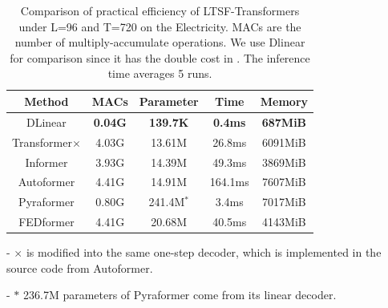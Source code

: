 \begin{table}[h]
\vspace{-0.1cm}
        \centering
        \scalebox{0.9}
        {
        	{%
                \begin{tabular}{c|cccc} \hline
                Method      & MACs & Parameter & Time & Memory\\\hline
                DLinear  & \textbf{0.04G}   & \textbf{139.7K}    & \textbf{0.4ms}     &\textbf{687MiB}        \\\hline
                Transformer$\times$ & 4.03G   & 13.61M     & 26.8ms     &6091MiB \\
                Informer    & 3.93G   & 14.39M     & 49.3ms     &3869MiB        \\
                Autoformer  & 4.41G   & 14.91M     & 164.1ms     &7607MiB        \\
                Pyraformer & 0.80G    &  241.4M$^*$   & 3.4ms     &7017MiB          \\
                FEDformer   & 4.41G   & 20.68M     & 40.5ms     &4143MiB \\\hline       
                \end{tabular}%
        	}
            }
            \begin{tablenotes}
            \tiny
            {
            \item - $\times$ is modified into the same one-step decoder, which is implemented in the source code from Autoformer.
            \item - $*$ 236.7M parameters of Pyraformer come from its linear decoder. 
            }
            \end{tablenotes} %
            \vspace{-0.2cm}
        \caption{Comparison of practical efficiency of LTSF-Transformers under L=96 and T=720 on the Electricity. MACs are the number of multiply-accumulate operations. We use Dlinear for comparison since it has the double cost in \modelname. The inference time averages 5 runs.}
\label{tab:efficiency}
\vspace{-0.3cm}
\end{table}





